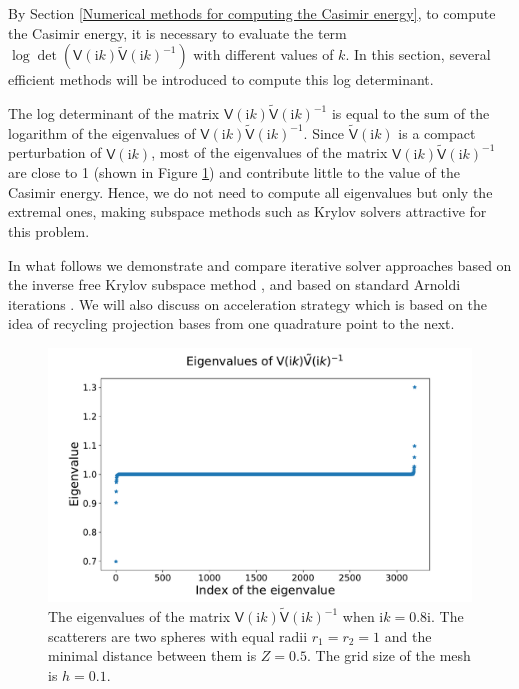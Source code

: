 By Section \ref{Numerical methods for computing the Casimir energy}, to compute the Casimir energy, it is necessary to evaluate the term
$\log\det(\mathsf{V}(\mathrm{i}k)\tilde{\mathsf{V}}(\mathrm{i}k)^{-1})$ 
with different values of $k$. In this section, several efficient methods will be introduced to compute this log determinant.

The log determinant of the matrix $\mathsf{V}(\mathrm{i}k)\tilde{\mathsf{V}}(\mathrm{i}k)^{-1}$ is equal to the sum of the logarithm of the eigenvalues of 
$\mathsf{V}(\mathrm{i}k)\tilde{\mathsf{V}}(\mathrm{i}k)^{-1}$. Since $\tilde{\mathsf{V}}(\mathrm{i}k)$ is a compact perturbation of $\mathsf{V}(\mathrm{i}k)$,
most of the eigenvalues of the matrix $\mathsf{V}(\mathrm{i}k)\tilde{\mathsf{V}}(\mathrm{i}k)^{-1}$ are close to 1 
(shown in Figure \ref{eigenvalues of VVtilde}) and contribute little to the value of the Casimir energy. Hence, we do not need to compute all eigenvalues but only
the extremal ones, making subspace methods such as Krylov solvers attractive for this problem.

In what follows we demonstrate and compare iterative solver approaches based on the inverse free Krylov subspace method \cite{golub2002inverse} \cite{money2005algorithm}, 
and based on standard Arnoldi iterations \cite{arnoldi1951principle}.
We will also discuss on acceleration strategy which is based on the idea of recycling projection bases from one quadrature point to the next. 


\begin{figure}[H]
    \centering
    \includegraphics[scale = 0.4]{figures/eigenvalue_of_VVtilde.pdf}
    \caption{The eigenvalues of the matrix $\mathsf{V}(\mathrm{i}k)\tilde{\mathsf{V}}(\mathrm{i}k)^{-1}$ when $\mathrm{i}k = 0.8\mathrm{i}$.
    The scatterers are two spheres with equal radii $r_{1} = r_{2} = 1$ and the minimal distance between them is $Z = 0.5$. The grid size of the mesh is $h = 0.1$.}
    \label{eigenvalues of VVtilde}
\end{figure}

